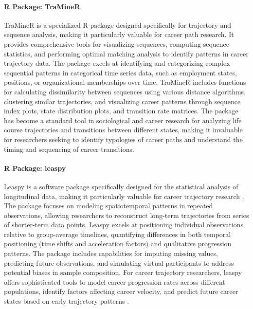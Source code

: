 \documentclass[../main.tex]{subfiles}
\begin{document}
\paragraph{R Package: TraMineR}
TraMineR is a specialized R package designed specifically for trajectory and sequence analysis, making it particularly valuable for career path research. It provides comprehensive tools for visualizing sequences, computing sequence statistics, and performing optimal matching analysis to identify patterns in career trajectory data. The package excels at identifying and categorizing complex sequential patterns in categorical time series data, such as employment states, positions, or organizational memberships over time. TraMineR includes functions for calculating dissimilarity between sequences using various distance algorithms, clustering similar trajectories, and visualizing career patterns through sequence index plots, state distribution plots, and transition rate matrices. The package has become a standard tool in sociological and career research for analyzing life course trajectories and transitions between different states, making it invaluable for researchers seeking to identify typologies of career paths and understand the timing and sequencing of career transitions.

\paragraph{R Package: leaspy}
Leaspy is a software package specifically designed for the statistical analysis of longitudinal data, making it particularly valuable for career trajectory research \cite{leaspy2024}. The package focuses on modeling spatiotemporal patterns in repeated observations, allowing researchers to reconstruct long-term trajectories from series of shorter-term data points. Leaspy excels at positioning individual observations relative to group-average timelines, quantifying differences in both temporal positioning (time shifts and acceleration factors) and qualitative progression patterns. The package includes capabilities for imputing missing values, predicting future observations, and simulating virtual participants to address potential biases in sample composition. For career trajectory researchers, leaspy offers sophisticated tools to model career progression rates across different populations, identify factors affecting career velocity, and predict future career states based on early trajectory patterns \cite{leaspy2024}.
\end{document}
